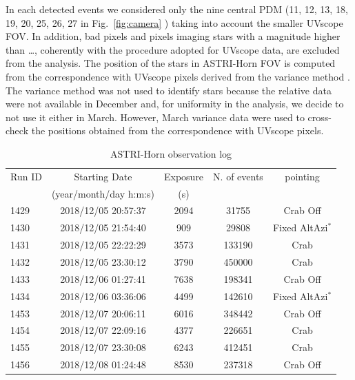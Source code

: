 In each detected events we considered only the nine central PDM (11, 12, 13, 18, 19, 20, 25, 26, 27 in Fig.~\ref{fig:camera} ) taking into account the smaller UVscope FOV.  In addition, bad pixels and pixels imaging stars with a magnitude higher than …, coherently with the procedure adopted for UVscope data, are excluded from the analysis. The position of the stars in ASTRI-Horn FOV is computed from the correspondence with UVscope pixels derived from the variance method \citep{Segreto2019}. 
The variance method was not used to identify stars because the relative data were not available in December and, for uniformity in the analysis, we decide to not use it either in March.  However, March variance data were used to cross-check the positions obtained from the correspondence with UVscope pixels.

\begin{table}[ht]
\caption{ASTRI-Horn observation log}
\centering
\begin{tabular}{lcccc}
\hline\hline
Run ID & Starting Date & Exposure      & N. of events & pointing \\
               & (year/month/day h:m:s) & (s)  \\
\hline     
1429 & 2018/12/05 20:57:37  &   2094     & 31755 & Crab Off    \\
1430 & 2018/12/05 21:54:40  &   909      & 29808 & Fixed AltAzi$^*$    \\
1431 & 2018/12/05 22:22:29  &   3573     & 133190 & Crab     \\ %
1432 & 2018/12/05 23:30:12  &   3790     & 450000 & Crab     \\ %
1433 & 2018/12/06 01:27:41  &   7638     & 198341 & Crab Off    \\ %
1434 & 2018/12/06 03:36:06  &   4499     & 142610 &  Fixed AltAzi$^*$  \\ %
1453 & 2018/12/07 20:06:11  &   6016     & 348442 & Crab Off    \\
1454 & 2018/12/07 22:09:16  &   4377     & 226651 &  Crab \\ %
1455 & 2018/12/07 23:30:08  &   6243     & 412451 &  Crab \\ %
1456 & 2018/12/08 01:24:48  &  8530     & 237318 & Crab Off \\ %

\end{tabular}
\end{table}
